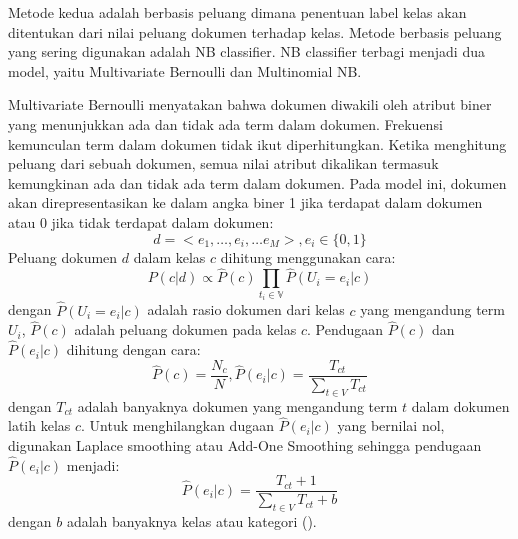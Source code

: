 Metode kedua adalah berbasis peluang dimana penentuan label kelas akan ditentukan dari nilai peluang dokumen terhadap kelas. Metode berbasis peluang yang sering digunakan adalah NB classifier. NB classifier terbagi menjadi dua model, yaitu Multivariate Bernoulli dan Multinomial NB.

Multivariate Bernoulli menyatakan bahwa dokumen diwakili oleh atribut biner yang menunjukkan ada dan tidak ada term dalam dokumen. Frekuensi kemunculan term dalam dokumen tidak ikut diperhitungkan. Ketika menghitung peluang dari sebuah dokumen, semua nilai atribut dikalikan termasuk kemungkinan ada dan tidak ada term dalam dokumen. Pada model ini, dokumen akan direpresentasikan ke dalam angka biner 1 jika terdapat dalam dokumen atau 0 jika tidak terdapat dalam dokumen:
\begin{equation*}
	d=<e_1, \dots, e_i, \dots e_M >, e_i\in \{0,1\}
\end{equation*}
\noindent Peluang dokumen $d$ dalam kelas $c$ dihitung menggunakan cara:
\begin{equation}
	\label{eq:peluangNBbernoulli}
	P(c|d)\propto \hat{P}(c)\prod_{t_i\in \mathbb{V}}\hat{P}(U_i=e_i|c)
\end{equation}
\noindent dengan $\hat{P}(U_i=e_i|c)$ adalah rasio dokumen dari kelas $c$ yang mengandung term $U_i$, $\hat{P}(c)$ adalah peluang dokumen pada kelas $c$. Pendugaan $\hat{P}(c)$ dan $\hat{P}(e_i|c)$ dihitung dengan cara:
\begin{equation*}
	\hat{P}(c)=\frac{N_c}{N},\xspace 
	\hat{P}(e_i|c)=\frac{T_{ct}}{\sum_{t\in V}T_{ct}}
\end{equation*}
\noindent dengan $T_{ct}$ adalah banyaknya dokumen yang mengandung term $t$ dalam dokumen latih kelas $c$. Untuk menghilangkan dugaan $\hat{P}(e_i|c)$ yang bernilai nol, digunakan Laplace smoothing atau Add-One Smoothing sehingga pendugaan $\hat{P}(e_i|c)$ menjadi:
\begin{equation}
	\label{eq:laplaceBernoulli}
	\hat{P}(e_i|c)=\frac{T_{ct}+1}{\sum_{t\in V}T_{ct}+b}
\end{equation}
\noindent dengan $b$ adalah banyaknya kelas atau kategori (\cite{MANNING}).

